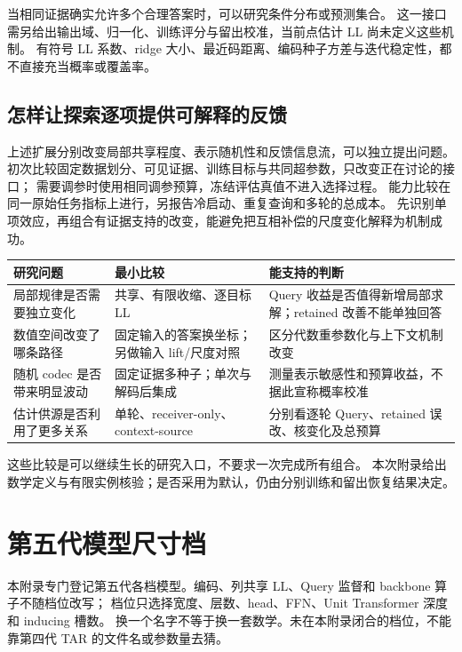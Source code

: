 \documentclass[11pt,UTF8,fontset=fandol]{ctexart}
\numberwithin{equation}{section}
\theoremstyle{definition}
\begin{document}
当相同证据确实允许多个合理答案时，可以研究条件分布或预测集合。
这一接口需另给出输出域、归一化、训练评分与留出校准，当前点估计 LL 尚未定义这些机制。
有符号 LL 系数、ridge 大小、最近码距离、编码种子方差与迭代稳定性，都不直接充当概率或覆盖率。

\subsection{怎样让探索逐项提供可解释的反馈}
\label{v53g:subsec:research-questions}
上述扩展分别改变局部共享程度、表示随机性和反馈信息流，可以独立提出问题。
初次比较固定数据划分、可见证据、训练目标与共同超参数，只改变正在讨论的接口；
需要调参时使用相同调参预算，冻结评估真值不进入选择过程。
能力比较在同一原始任务指标上进行，另报告冷启动、重复查询和多轮的总成本。
先识别单项效应，再组合有证据支持的改变，能避免把互相补偿的尺度变化解释为机制成功。

\begin{center}\small
\begin{tabularx}{\linewidth}{>{\raggedright\arraybackslash}p{25mm}XX}
\toprule
研究问题 & 最小比较 & 能支持的判断\\\midrule
局部规律是否需要独立变化 & 共享、有限收缩、逐目标 LL & Query 收益是否值得新增局部求解；retained 改善不能单独回答\\
数值空间改变了哪条路径 & 固定输入的答案换坐标；另做输入 lift/尺度对照 & 区分代数重参数化与上下文机制改变\\
随机 codec 是否带来明显波动 & 固定证据多种子；单次与解码后集成 & 测量表示敏感性和预算收益，不据此宣称概率校准\\
估计供源是否利用了更多关系 & 单轮、receiver-only、context-source & 分别看逐轮 Query、retained 误改、核变化及总预算\\\bottomrule
\end{tabularx}
\end{center}
这些比较是可以继续生长的研究入口，不要求一次完成所有组合。
本次附录给出数学定义与有限实例核验；是否采用为默认，仍由分别训练和留出恢复结果决定。

\section{第五代模型尺寸档}
\label{v54:app:sizes}\label{v54:sec:size-family}
本附录专门登记第五代各档模型。编码、列共享 LL、Query 监督和 backbone 算子不随档位改写；
档位只选择宽度、层数、head、FFN、Unit Transformer 深度和 inducing 槽数。
换一个名字不等于换一套数学。未在本附录闭合的档位，不能靠第四代 TAR 的文件名或参数量去猜。
\end{document}
